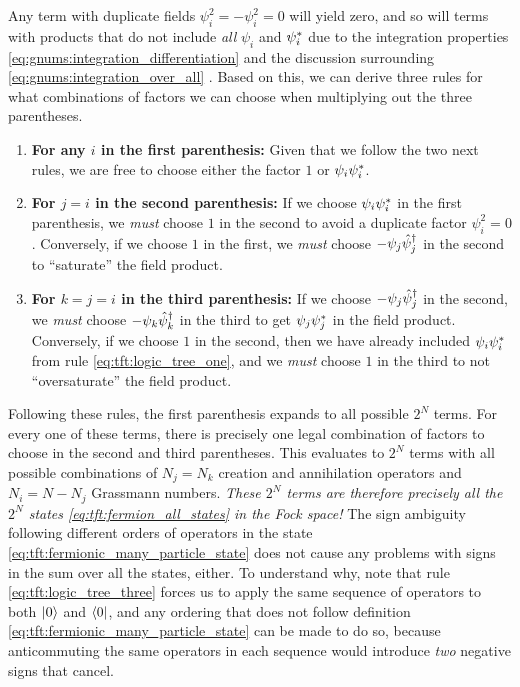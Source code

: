 Any term with duplicate fields $\psi_i^2 = -\psi_i^2 = 0$ will yield zero, and so will terms with products that do not include \emph{all} $\psi_i$ and ${\psi}^*_i$ due to the integration properties \eqref{eq:gnums:integration_differentiation} and the discussion surrounding \cref{eq:gnums:integration_over_all} .
Based on this, we can derive three rules for what combinations of factors we can choose when multiplying out the three parentheses. 
\begin{enumerate}
\item \textbf{For any $i$ in the first parenthesis:} Given that we follow the two next rules, we are free to choose either the factor $1$ or $\psi_i {\psi}^*_i$. \label{eq:tft:logic_tree_one}
\item \textbf{For $j=i$ in the second parenthesis:} 
If we choose $\psi_i {\psi}^*_i$ in the first parenthesis, we \emph{must} choose $1$ in the second to avoid a duplicate factor $\psi_i^2 = 0$.
Conversely, if we choose $1$ in the first, we \emph{must} choose $-\psi_j \hat\psi^\dagger_j$ in the second to ``saturate'' the field product.
\item \textbf{For $k = j = i$ in the third parenthesis:} 
If we choose $-\psi_j \hat\psi^\dagger_j$ in the second, we \emph{must} choose $-\psi_k \hat\psi^\dagger_k$ in the third to get $\psi_j {\psi}^*_j$ in the field product.
Conversely, if we choose $1$ in the second, then we have already included $\psi_i {\psi}^*_i$ from rule \ref{eq:tft:logic_tree_one}, and we \emph{must} choose $1$ in the third to not ``oversaturate'' the field product. \label{eq:tft:logic_tree_three}
\end{enumerate}
Following these rules, the first parenthesis expands to all possible $2^N$ terms.
For every one of these terms, there is precisely one legal  combination of factors to choose in the second and third parentheses.
This evaluates to $2^N$ terms with all possible combinations of $N_j = N_k$ creation and annihilation operators and $N_i = N - N_j$ Grassmann numbers.
\emph{These $2^N$ terms are therefore precisely all the $2^N$ states \eqref{eq:tft:fermion_all_states} in the Fock space!}
The sign ambiguity following different orders of operators in the state \eqref{eq:tft:fermionic_many_particle_state} does not cause any problems with signs in the sum over all the states, either.
To understand why, note that rule \ref{eq:tft:logic_tree_three} forces us to apply the same sequence of operators to both $\ket{0}$ and $\bra{0}$, and any ordering that does not follow definition \eqref{eq:tft:fermionic_many_particle_state} can be made to do so, because anticommuting the same operators in each sequence would introduce \emph{two} negative signs that cancel.
